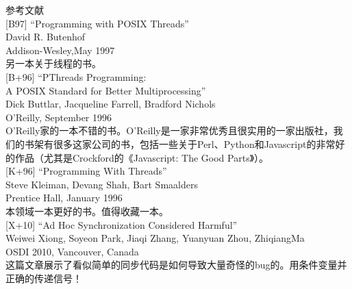 \newpage

参考文献\\

[B97] “Programming with POSIX Threads”\\
David R. Butenhof\\
Addison-Wesley,May 1997\\
另一本关于线程的书。\\


[B+96] “PThreads Programming:\\
A POSIX Standard for Better Multiprocessing”\\
Dick Buttlar, Jacqueline Farrell, Bradford Nichols\\
O’Reilly, September 1996\\
O’Reilly家的一本不错的书。O’Reilly是一家非常优秀且很实用的一家出版社，我们的书架有很多这家公司的书，包括一些关于Perl、Python和Javascript的非常好的作品（尤其是Crockford的《Javascript: The Good Parts》）。\\


[K+96] “Programming With Threads”\\
Steve Kleiman, Devang Shah, Bart Smaalders\\
Prentice Hall, January 1996\\
本领域一本更好的书。值得收藏一本。\\


[X+10] “Ad Hoc Synchronization Considered Harmful”\\
Weiwei Xiong, Soyeon Park, Jiaqi Zhang, Yuanyuan Zhou, ZhiqiangMa\\
OSDI 2010, Vancouver, Canada\\
这篇文章展示了看似简单的同步代码是如何导致大量奇怪的bug的。用条件变量并正确的传递信号！
















